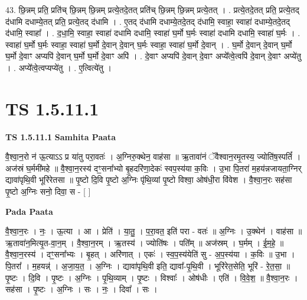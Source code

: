 \documentclass[17pt]{extarticle}
\begin{document}
43. छि॒न्नम् प्रति॒ प्रति॑च् छि॒न्नम् छि॒न्नम् प्रत्ये॒तदे॒तत् प्रति॑च् छि॒न्नम् छि॒न्नम् प्रत्ये॒तत् । . प्रत्ये॒तदे॒तत् प्रति॒ प्रत्ये॒तद् द॑धामि दधाम्ये॒तत् प्रति॒ प्रत्ये॒तद् द॑धामि । . ए॒तद् द॑धामि दधाम्ये॒तदे॒तद् द॑धामि॒ स्वाहा॒ स्वाहा॑ दधाम्ये॒तदे॒तद् द॑धामि॒ स्वाहा᳚ । . द॒धा॒मि॒ स्वाहा॒ स्वाहा॑ दधामि दधामि॒ स्वाहा॑ घ॒र्मो घ॒र्मः स्वाहा॑ दधामि दधामि॒ स्वाहा॑ घ॒र्मः । . स्वाहा॑ घ॒र्मो घ॒र्मः स्वाहा॒ स्वाहा॑ घ॒र्मो दे॒वान् दे॒वान् घ॒र्मः स्वाहा॒ स्वाहा॑ घ॒र्मो दे॒वान् । . घ॒र्मो दे॒वान् दे॒वान् घ॒र्मो घ॒र्मो दे॒वाꣳ अप्यपि॑ दे॒वान् घ॒र्मो घ॒र्मो दे॒वाꣳ अपि॑ । . दे॒वाꣳ अप्यपि॑ दे॒वान् दे॒वाꣳ अप्ये᳚त्वे॒त्वपि॑ दे॒वान् दे॒वाꣳ अप्ये॑तु । . अप्ये᳚त्वे॒त्वप्यप्ये॑तु । . ए॒त्वित्ये॑तु । \newline
\pagebreak
{}
\section*{ TS 1.5.11.1 }

\textbf{TS 1.5.11.1 } \newline
\textbf{Samhita Paata} \newline

वै॒श्वा॒न॒रो न॑ ऊ॒त्याऽऽ प्र या॑तु परा॒वतः॑ । अ॒ग्निरु॒क्थेन॒ वाह॑सा ॥ ऋ॒तावा॑नं ॅवैश्वान॒रमृ॒तस्य॒ ज्योति॑ष॒स्पतिं᳚ । अज॑स्रं घ॒र्ममी॑महे ॥ वै॒श्वा॒न॒रस्य॑ दꣳ॒॒सना᳚भ्यो बृ॒हदरि॑णा॒देकः॑ स्वप॒स्य॑या क॒विः । उ॒भा पि॒तरा॑ म॒हय॑न्नजायता॒ग्निर् द्यावा॑पृथि॒वी भूरि॑रेतसा ॥ पृ॒ष्टो दि॒वि पृ॒ष्टो अ॒ग्निः पृ॑थि॒व्यां पृ॒ष्टो विश्वा॒ ओष॑धी॒रा वि॑वेश । वै॒श्वा॒न॒रः सह॑सा पृ॒ष्टो अ॒ग्निः सनो॒ दिवा॒ स - [ ] \newline

\textbf{Pada Paata} \newline

वै॒श्वा॒न॒रः । नः॒ । ऊ॒त्या । आ । प्रेति॑ । या॒तु॒ । प॒रा॒वत॒ इति॑ परा - वतः॑ ॥ अ॒ग्निः । उ॒क्थेन॑ । वाह॑सा ॥ ऋ॒तावा॑न॒मित्यृ॒त-वा॒न॒म् । वै॒श्वा॒न॒रम् । ऋ॒तस्य॑ । ज्योति॑षः । पति᳚म् ॥ अज॑स्रम् । घ॒र्मम् । ई॒म॒हे॒ ॥ वै॒श्वा॒न॒रस्य॑ । दꣳ॒॒सना᳚भ्यः । बृ॒हत् । अरि॑णात् । एकः॑ । स्व॒प॒स्य॑येति॑ सु - अ॒प॒स्य॑या । क॒विः ॥ उ॒भा । पि॒तरा᳚ । म॒हयन्न्॑ । अ॒जा॒य॒त॒ । अ॒ग्निः । द्यावा॑पृथि॒वी इति॒ द्यावा᳚-पृ॒थि॒वी । भूरि॑रेत॒सेति॒ भूरि॑ - रे॒त॒सा॒ ॥ पृ॒ष्टः । दि॒वि । पृ॒ष्टः । अ॒ग्निः । पृ॒थि॒व्याम् । पृ॒ष्टः । विश्वाः᳚ । ओष॑धीः । एति॑ । वि॒वे॒श॒ ॥ वै॒श्वा॒न॒रः । सह॑सा । पृ॒ष्टः । अ॒ग्निः । सः । नः॒ । दिवा᳚ । सः ।  \newline
\end{document}

